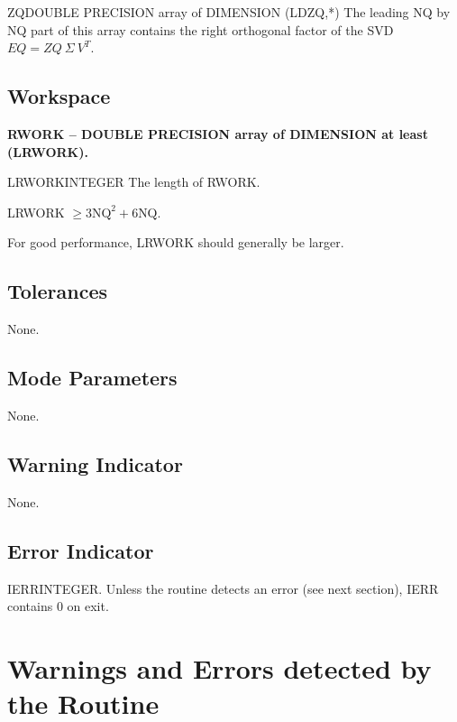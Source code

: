 \begin{entry}{ZQ}{DOUBLE PRECISION array of DIMENSION (LDZQ,*)}
  The leading NQ by NQ part of this array contains the right
  orthogonal factor of the SVD $EQ = ZQ\ \Sigma\ V^T$. 
\end{entry}

\subsection{Workspace}

\noindent
{\bf RWORK -- {DOUBLE PRECISION array of DIMENSION at least (LRWORK)}.}
\medskip

\begin{entry}{LRWORK}{INTEGER}
  The length of RWORK. 

  LRWORK $\ge 3 \mbox{NQ}^2 + 6 \mbox{NQ}$.

  For good performance, LRWORK should generally be larger.
\end{entry}

\subsection{Tolerances}
None.

\subsection{Mode Parameters}
None.

\subsection{Warning Indicator}
None.

\subsection{Error Indicator}

\begin{entry}{IERR}{INTEGER.}
  Unless the routine detects an error (see next section), IERR
  contains 0 on exit. 
\end{entry}

\section{Warnings and Errors detected by the Routine}


